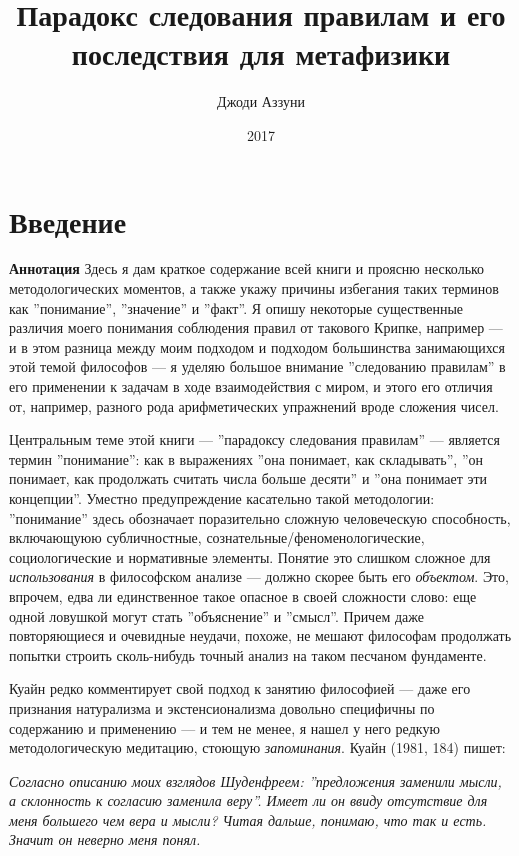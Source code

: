 \documentclass[11pt]{book}
\title{Парадокс следования правилам и его последствия для метафизики}
\author{Джоди Аззуни}
\date{2017}
\begin{document}
\maketitle

\tableofcontents

\chapter{Введение}

\qquad

\textbf{Аннотация} \quad Здесь я дам краткое содержание всей книги и проясню несколько методологических моментов, а также укажу причины избегания таких терминов как ''понимание'', ''значение'' и ''факт''. Я опишу некоторые существенные различия моего понимания соблюдения правил от такового Крипке, например --- и в этом разница между моим подходом и подходом большинства занимающихся этой темой философов --- я уделяю большое внимание ''следованию правилам'' в его применении к задачам в ходе взаимодействия с миром, и этого его отличия от, например, разного рода арифметических упражнений вроде сложения чисел.

\qquad

Центральным теме этой книги --- ''парадоксу следования правилам'' --- является термин ''понимание'': как в выражениях ''она понимает, как складывать'', ''он понимает, как продолжать считать числа больше десяти'' и ''она понимает эти концепции''. Уместно предупреждение касательно такой методологии: ''понимание'' здесь обозначает поразительно сложную человеческую способность, включающуюю субличностные, сознательные/феноменологические, социологические и нормативные элементы. Понятие это слишком сложное для \textit{использования} в философском анализе --- должно скорее быть его \textit{объектом}. Это, впрочем, едва ли единственное такое опасное в своей сложности слово: еще одной ловушкой могут стать ''объяснение'' и ''смысл''. Причем даже повторяющиеся и очевидные неудачи, похоже, не мешают философам продолжать попытки строить сколь-нибудь точный анализ на таком песчаном фундаменте.

Куайн редко комментирует свой подход к занятию философией --- даже его признания натурализма и экстенсионализма довольно специфичны по содержанию и применению --- и тем не менее, я нашел у него редкую методологическую медитацию, стоющую \textit{запоминания}. Куайн (1981, 184) пишет:

\smallskip

\textit{Согласно описанию моих взглядов Шуденфреем: ''предложения заменили мысли, а склонность к согласию заменила веру''. Имеет ли он ввиду отсутствие для меня большего чем вера и мысли? Читая дальше, понимаю, что так и есть. Значит он неверно меня понял.}
\end{document}
